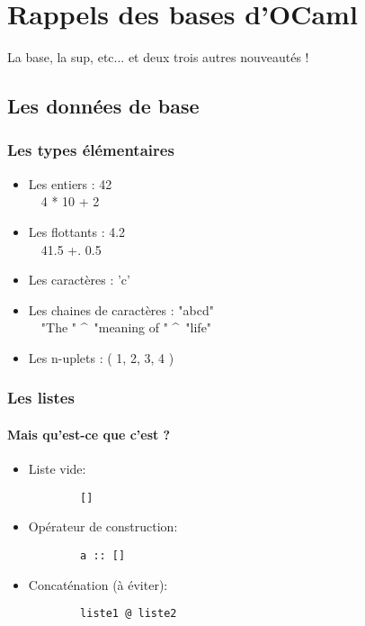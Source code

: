 \section{Rappels des bases d'OCaml}
\begin{frame}
  \begin{center}
	\huge
	La base, la sup, etc... et deux trois autres nouveautés !
  \end{center}
\end{frame}

\subsection{Les données de base} %
\begin{frame}[fragile]
	\frametitle{Les types élémentaires}
	\begin{itemize}
		\item Les entiers : 42\\
			~~4 * 10 + 2
		\item Les flottants : 4.2\\
			~~41.5 +. 0.5
		\item Les caractères : 'c'\\
		\item Les chaines de caractères : "abcd"\\
			~~"The " \^~"meaning of " \^~"life"
			\item Les n-uplets : ( 1, 2, 3, 4 )
	\end{itemize}
\end{frame}

\begin{frame}[fragile]
	\frametitle{Les listes}
	\framesubtitle{Mais qu'est-ce que c'est ?}
	\begin{itemize}

	\item Liste vide:
		\begin{lstlisting}
		[]
		\end{lstlisting}

	\item Opérateur de construction:
		\begin{lstlisting}
		a :: []
		\end{lstlisting}

	\item Concaténation (à éviter):
		\begin{lstlisting}
		liste1 @ liste2
		\end{lstlisting}

	\end{itemize}
\end{frame}

